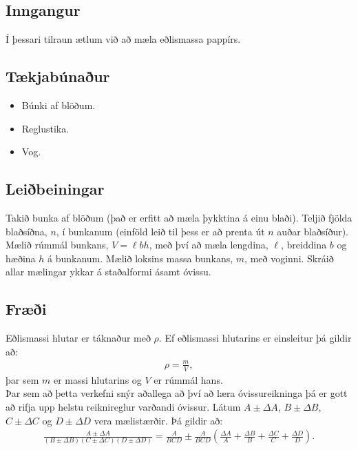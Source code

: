 \documentclass[oneside]{book}
\theoremstyle{definition}
\begin{document}
\subsection*{Inngangur}

Í þessari tilraun ætlum við að mæla eðlismassa pappírs.

\subsection*{Tækjabúnaður}

\begin{itemize}
    \item Búnki af blöðum.
    
    \item Reglustika.
    
    \item Vog.
\end{itemize}

\subsection*{Leiðbeiningar}

Takið bunka af blöðum (það er erfitt að mæla þykktina á einu blaði). Teljið fjölda blaðsíðna, $n$, í bunkanum (einföld leið til þess er að prenta út $n$ auðar blaðsíður). Mælið rúmmál bunkans, $V = \ell b h$, með því að mæla lengdina, $\ell$, breiddina $b$ og hæðina $h$ á bunkanum. Mælið loksins massa bunkans, $m$, með voginni. Skráið allar mælingar ykkar á staðalformi ásamt óvissu.

\subsection*{Fræði}

Eðlismassi hlutar er táknaður með $\rho$. Ef eðlismassi hlutarins er einsleitur þá gildir að:
\begin{align*}
    \rho = \frac{m}{V},
\end{align*}
þar sem $m$ er massi hlutarins og $V$ er rúmmál hans. \\

Þar sem að þetta verkefni snýr aðallega að því að læra óvissureikninga þá er gott að rifja upp helstu reiknireglur varðandi óvissur. Látum $A \pm \Delta A$, $B \pm \Delta B$, $C \pm \Delta C$ og $D \pm \Delta D$ vera mælistærðir. Þá gildir að:
\begin{align*}
    \frac{A \pm \Delta A}{\left( B \pm \Delta B\right)\left( C \pm \Delta C\right)\left( D \pm \Delta D\right)} = \frac{A}{BCD} \pm \frac{A}{BCD}\left( \frac{\Delta A}{A} + \frac{\Delta B}{B} + \frac{\Delta C}{C} + \frac{\Delta D}{D} \right).
\end{align*}
\end{document}
